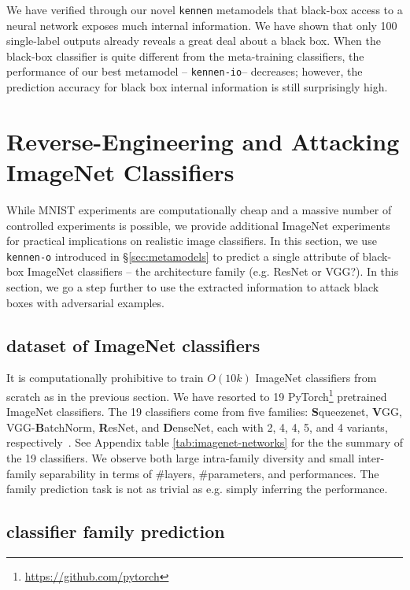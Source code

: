 \documentclass{article} %
\newcommand{\kennen}{\texttt{kennen}\xspace}
\newcommand{\OR}{\texttt{kennen-o}\xspace}
\newcommand{\ORIC}{\texttt{kennen-io}\xspace}
\begin{document}
We have verified through our novel \kennen metamodels that black-box access to a neural network exposes much internal information. We have shown that only 100 single-label outputs already reveals a great deal about a black box. When the black-box classifier is quite different from the meta-training classifiers, the performance of our best metamodel -- \ORIC -- decreases; however, the prediction accuracy for black box internal information is still surprisingly high.

\section{\label{sec:imagenet}Reverse-Engineering and Attacking ImageNet Classifiers}

While MNIST experiments are computationally cheap and a massive number of controlled experiments is possible, we provide additional ImageNet experiments for practical implications on realistic image classifiers. In this section, we use \OR introduced in \S\ref{sec:metamodels} to predict a single attribute of black-box ImageNet classifiers -- the architecture family (e.g. ResNet or VGG?). In this section, we go a step further to use the extracted information to attack black boxes with adversarial examples.

\subsection{dataset of ImageNet classifiers}
It is computationally prohibitive to train $O(10k)$ ImageNet classifiers from scratch as in the previous section. We have resorted to 19 PyTorch\footnote{\url{https://github.com/pytorch}} pretrained ImageNet classifiers. The 19 classifiers come from five families: {\bf S}queezenet, {\bf V}GG, VGG-{\bf B}atchNorm, {\bf R}esNet, and {\bf D}enseNet, each with 2, 4, 4, 5, and 4 variants, respectively~\citep{SqueezeNet,Simonyan14vgg,batchNorm,He2016DeepRL,huang2017densely}. See Appendix table \ref{tab:imagenet-networks} for the the summary of the 19 classifiers. We observe both large intra-family diversity and small inter-family separability in terms of \#\ignorespaces layers, \#\ignorespaces parameters, and performances. The family prediction task is not as trivial as e.g. simply inferring the performance.

\subsection{classifier family prediction}
\end{document}
